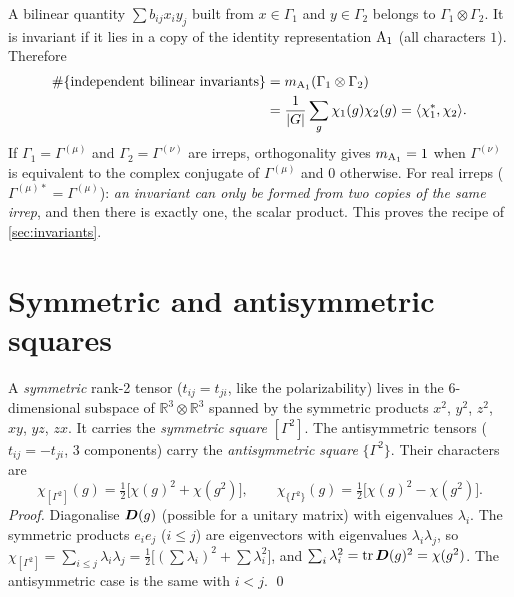 A bilinear quantity $\sum b_{ij}x_iy_j$ built from $x\in\Gamma_1$ and $y\in\Gamma_2$
belongs to $\Gamma_1\otimes\Gamma_2$. It is invariant if it lies in a copy of the
identity representation $\mathrm{A}_1$ (all characters $1$). Therefore
\begin{equation}\label{eq:ninv}
\begin{aligned}
\#\{\text{independent bilinear invariants}\}
 &=m_{\mathrm{A}_1}(\Gamma_1\otimes\Gamma_2)\\
 &=\frac{1}{\lvert G\rvert}\sum_g\chi_1(g)\chi_2(g)
 =\langle \chi_1^{*}, \chi_2\rangle.
\end{aligned}
\end{equation}
If $\Gamma_1=\Gamma^{(\mu)}$ and $\Gamma_2=\Gamma^{(\nu)}$ are irreps, orthogonality
gives $m_{\mathrm{A}_1}=1$ when $\Gamma^{(\nu)}$ is equivalent to the complex conjugate
of $\Gamma^{(\mu)}$ and $0$ otherwise. For real irreps
($\Gamma^{(\mu)*}=\Gamma^{(\mu)}$): \emph{an invariant can only be formed from two
copies of the same irrep}, and then there is exactly one, the scalar product. This
proves the recipe of \cref{sec:invariants}.

\section{Symmetric and antisymmetric squares}\label{sec:symsq}

A \emph{symmetric} rank-2 tensor ($t_{ij}=t_{ji}$, like the polarizability) lives in
the 6-dimensional subspace of $\mathbb{R}^3\otimes\mathbb{R}^3$ spanned by the
symmetric products $x^2$, $y^2$, $z^2$, $xy$, $yz$, $zx$. It carries the \emph{symmetric square}
$[\Gamma^2]$. The antisymmetric tensors ($t_{ij}=-t_{ji}$, 3 components) carry the
\emph{antisymmetric square} $\{\Gamma^2\}$. Their characters are
\begin{equation}\label{eq:symsq}
\chi_{[\Gamma^2]}(g)=\tfrac12\bigl[\chi(g)^2+\chi(g^2)\bigr],\qquad
\chi_{\{\Gamma^2\}}(g)=\tfrac12\bigl[\chi(g)^2-\chi(g^2)\bigr].
\end{equation}
\emph{Proof.} Diagonalise $\bm{D}(g)$ (possible for a unitary matrix) with
eigenvalues $\lambda_i$. The symmetric products $e_ie_j$ ($i\le j$) are eigenvectors
with eigenvalues $\lambda_i\lambda_j$, so
$\chi_{[\Gamma^2]}=\sum_{i\le j}\lambda_i\lambda_j=\tfrac12\bigl[(\sum\lambda_i)^2+\sum\lambda_i^2\bigr]$,
and $\sum_i\lambda_i^2=\operatorname{tr}\bm{D}(g)^2=\chi(g^2)$. The antisymmetric case is the same
with $i<j$. \qed

